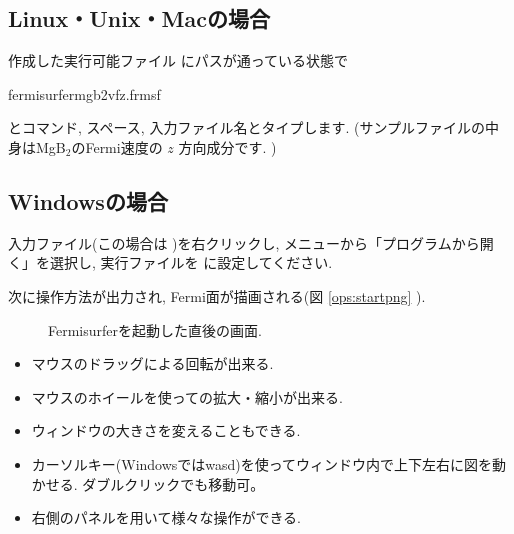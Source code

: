 \documentclass[letterpaper,10pt,dvipdfmx,openany]{sphinxmanual}
\let\sphinxpxdimen\pdfpxdimen\else\newdimen\sphinxpxdimen
\begin{document}
\subsection{Linux・Unix・Macの場合}
\label{\detokenize{ops:linuxunixmac}}
\sphinxAtStartPar
作成した実行可能ファイル  にパスが通っている状態で

\begin{sphinxVerbatim}[commandchars=\\\{\}]
\PYGZdl{}fermisurfermgb2\PYGZus{}vfz.frmsf
\end{sphinxVerbatim}

\sphinxAtStartPar
とコマンド, スペース, 入力ファイル名とタイプします.
(サンプルファイルの中身はMgB$_{\text{2}}$のFermi速度の \(z\) 方向成分です. )


\subsection{Windowsの場合}
\label{\detokenize{ops:windows}}
\sphinxAtStartPar
入力ファイル(この場合は )を右クリックし,
メニューから「プログラムから開く」を選択し,
実行ファイルを  に設定してください.

\sphinxAtStartPar
次に操作方法が出力され, Fermi面が描画される(図 \ref{ops:startpng} ).

\begin{figure}[htbp]
\centering
\capstart

\noindent\sphinxincludegraphics[width=500\sphinxpxdimen]{{start}.png}
\caption{Fermisurferを起動した直後の画面.}\label{\detokenize{ops:id23}}\label{\detokenize{ops:startpng}}\end{figure}
\begin{itemize}
\item {} 
\sphinxAtStartPar
マウスのドラッグによる回転が出来る.

\item {} 
\sphinxAtStartPar
マウスのホイールを使っての拡大・縮小が出来る.

\item {} 
\sphinxAtStartPar
ウィンドウの大きさを変えることもできる.

\item {} 
\sphinxAtStartPar
カーソルキー(Windowsではwasd)を使ってウィンドウ内で上下左右に図を動かせる.
ダブルクリックでも移動可。

\item {} 
\sphinxAtStartPar
右側のパネルを用いて様々な操作ができる.

\end{itemize}
\end{document}
